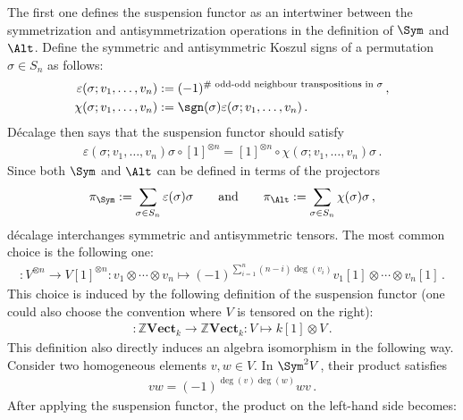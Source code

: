 \begin{remark}
        The first one defines the suspension functor as an intertwiner between the symmetrization and antisymmetrization operations in the definition of $\Sym$ and $\Alt$. Define the symmetric and antisymmetric Koszul signs of a permutation $\sigma\in S_n$ as follows:
        \begin{align}
            \varepsilon(\sigma;v_1,\ldots,v_n) &:= (-1)^{\#\text{ odd-odd neighbour transpositions in }\sigma}\,,\\
            \chi(\sigma;v_1,\ldots,v_n) &:= \sgn(\sigma)\varepsilon(\sigma;v_1,\ldots,v_n)\,.
        \end{align}
        D\'ecalage then says that the suspension functor should satisfy
        \begin{gather}
            \varepsilon(\sigma;v_1,\ldots,v_n)\sigma\circ[1]^{\otimes n} = [1]^{\otimes n}\circ\chi(\sigma;v_1,\ldots,v_n)\sigma\,.
        \end{gather}
        Since both $\Sym$ and $\Alt$ can be defined in terms of the projectors
        \begin{gather}
            \pi_{\Sym}:=\sum_{\sigma\in S_n}\varepsilon(\sigma)\sigma\qquad\text{and} \qquad \pi_{\Alt}:=\sum_{\sigma\in S_n}\chi(\sigma)\sigma\,,
        \end{gather}
        d\'ecalage interchanges symmetric and antisymmetric tensors. The most common choice is the following one:
        \begin{gather}
            [1]:V^{\otimes n}\rightarrow V[1]^{\otimes n}:v_1\otimes\cdots\otimes v_n\mapsto(-1)^{\sum_{i=1}^n(n-i)\deg(v_i)}v_1[1]\otimes\cdots\otimes v_n[1]\,.
        \end{gather}
        This choice is induced by the following definition of the suspension functor (one could also choose the convention where $V$ is tensored on the right):
        \begin{gather}
            [1]:\mathbb{Z}\mathbf{Vect}_k\rightarrow\mathbb{Z}\mathbf{Vect}_k:V\mapsto k[1]\otimes V\,.
        \end{gather}
        This definition also directly induces an algebra isomorphism in the following way. Consider two homogeneous elements $v,w\in V$. In $\Sym^2V$, their product satisfies
        \begin{gather}
            vw = (-1)^{\deg(v)\deg(w)}wv\,.
        \end{gather}
        After applying the suspension functor, the product on the left-hand side becomes:
        \begin{gather}

\end{gather}
\end{remark}
